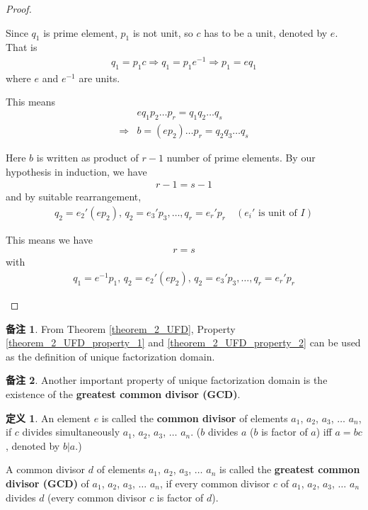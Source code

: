 \documentclass[utf8]{ctexbook}
\theoremstyle{definition}
\newtheorem{protodefinition}{定义}[section]
\newenvironment{definition}
   {\colorlet{shadecolor}{black!15}\begin{shaded}\begin{protodefinition}}
   {\end{protodefinition}\end{shaded}}
\newtheorem{memo}{备注}[section]
\begin{document}
\begin{proof}
\begin{itemize}
{Since $q_1$ is prime element, $p_1$ is not unit, so $c$ has to be a unit, denoted by $e$. That is
\begin{align*}
q_1 = p_1 c \Longrightarrow q_1 = p_1 e^{-1}  \Longrightarrow p_1 = e q_1 
\end{align*}
where $e$ and $e^{-1}$ are units.   

This means
\begin{align*}
& e q_1 p_2 \ldots p_r = q_1 q_2 \ldots q_s \\
\Longrightarrow & b = (e p_2) \ldots p_r = q_2 q_3 \ldots q_s
\end{align*}

Here $b$ is written as product of $ r - 1 $ number of prime elements. By our hypothesis in induction, we have 
\begin{align*}
r-1 = s -1 
\end{align*}
and by suitable rearrangement,
\begin{align*}
q_2 =e_2 ' (e p_2),\, q_2 = e_3 ' p_3, \ldots, q_r = e_r ' p_r \quad (e_i ' \mbox{ is unit of } I)
\end{align*}

This means we have
\begin{align*}
r = s
\end{align*}
with
\begin{align*}
q_1 = e^{-1} p_1, \, q_2 =e_2 ' (e p_2),\, q_2 = e_3 ' p_3, \ldots, q_r = e_r ' p_r 
\end{align*}
}
\end{itemize} 

\end{proof}


\begin{memo}
From Theorem \ref{theorem_2_UFD}, Property \ref{theorem_2_UFD_property_1} and \ref{theorem_2_UFD_property_2} can be used as the definition of unique factorization domain.
\end{memo}

\begin{memo}
Another important property of unique factorization domain is the existence of the \textbf{greatest common divisor (GCD)}. 
\end{memo}


\begin{definition}
\label{def_UDF_GCD}
An element $e$ is called the \textbf{common divisor} of elements $a_1$, $a_2$, $a_3$, $\ldots$ $a_n$, if $c$ divides simultaneously $a_1$, $a_2$, $a_3$, $\ldots$ $a_n$. ($b$ divides $a$ ($b$ is factor of $a$) iff $a = bc$, denoted by $b | a$.)

A common divisor $d$ of elements $a_1$, $a_2$, $a_3$, $\ldots$ $a_n$ is called the \textbf{greatest common divisor (GCD)} of $a_1$, $a_2$, $a_3$, $\ldots$ $a_n$, if every common divisor $c$ of 
$a_1$, $a_2$, $a_3$, $\ldots$ $a_n$ divides $d$ (every common divisor $c$ is factor of $d$).
\end{definition}
\end{document}
